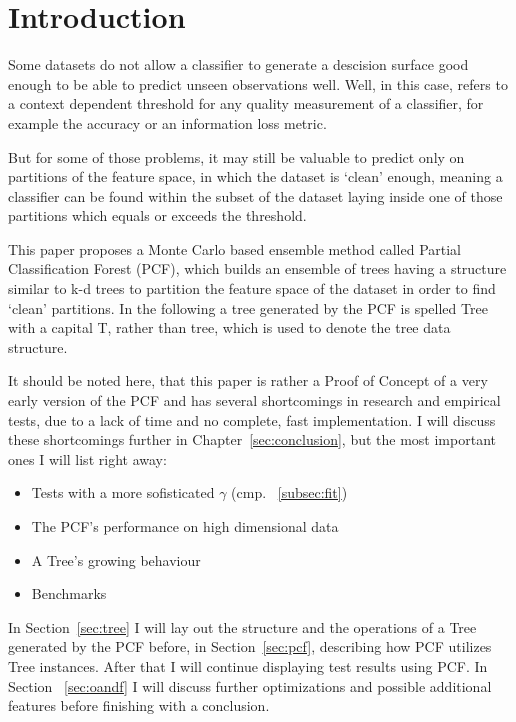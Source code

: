 \section{Introduction}

Some datasets do not allow a classifier to generate a
descision surface good enough to be able to predict unseen
observations well. Well, in this case, refers to a
context dependent threshold for any quality measurement of
a classifier, for example the accuracy or an information
loss metric.

But for some of those problems, it may still be valuable
to predict only on partitions of the feature space, in
which the dataset is `clean' enough, meaning a classifier
can be found within the subset of the dataset laying inside
one of those partitions which equals or exceeds the
threshold.

This paper proposes a Monte Carlo based ensemble method
called Partial Classification Forest (PCF), which builds an
ensemble of trees having a structure similar to
k-d trees to partition the feature space of the dataset in
order to find `clean' partitions. In the following a
tree generated by the PCF is spelled Tree with a capital
T, rather than tree, which is used to denote the tree data
structure.

It should be noted here, that this paper is rather a Proof
of Concept of a very early version of the PCF and has
several shortcomings in research and empirical tests, due
to a lack of time and no complete, fast implementation. I
will discuss these shortcomings further in
Chapter~\ref{sec:conclusion}, but the most important ones I
will list right away:

\begin{itemize}

\item Tests with a more sofisticated $\gamma$ (cmp.~%
      \ref{subsec:fit})

\item The PCF's performance on high dimensional data

\item A Tree's growing behaviour

\item Benchmarks

\end{itemize}

In Section~\ref{sec:tree} I will lay out
the structure and the operations of a Tree generated by the
PCF before, in Section~\ref{sec:pcf}, describing how PCF
utilizes Tree instances. After that I will continue
displaying test results using PCF\@. In Section~%
\ref{sec:oandf} I will discuss further optimizations and
possible additional features before finishing with a
conclusion.
